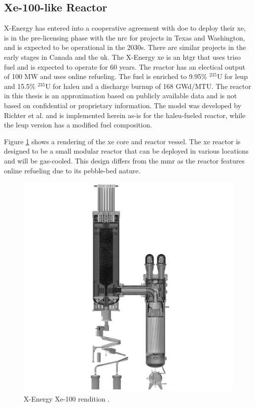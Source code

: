 \subsection{Xe-100-like Reactor}
\label{sec:xe}

X-Energy has entered into a cooperative agreement with \gls{doe} to deploy their \gls{xe}, is in the pre-licensing phase with the \gls{nrc} for projects in Texas and Washington, and is expected to be operational in the 2030s. There are similar projects in the early stages in Canada and the \gls{uk}. The X-Energy \gls{xe} is an \gls{htgr} that uses \gls{triso} fuel and is expected to operate for 60 years. The reactor has an electical output of 100 MW and uses online refueling. The fuel is enriched to 9.95\% $^{235}$U for \gls{leup} and 15.5\% $^{235}$U for \gls{haleu} and a discharge burnup of 168 GWd/MTU. The reactor in this thesis is an approximation based on publicly available data and is not based on confidential or proprietary information. The model was developed by Richter et al. \cite{richter_xe100_like} and is implemented herein as-is for the \gls{haleu}-fueled reactor, while the \gls{leup} version has a modified fuel composition.

Figure \ref{fig:xe_design} shows a rendering of the \gls{xe} core and reactor vessel. The \gls{xe} reactor is designed to be a small modular reactor that can be deployed in various locations and will be gas-cooled. This design differs from the \gls{mmr} as the reactor features online refueling due to its pebble-bed nature.

\begin{figure}[H]
    \centering
    \includegraphics[scale=0.09]{images/reactor_design/xe-100-reactor-slice.jpg}
    \caption{X-Energy Xe-100 rendition \cite{xe_reactor}.}
    \label{fig:xe_design}
\end{figure}

